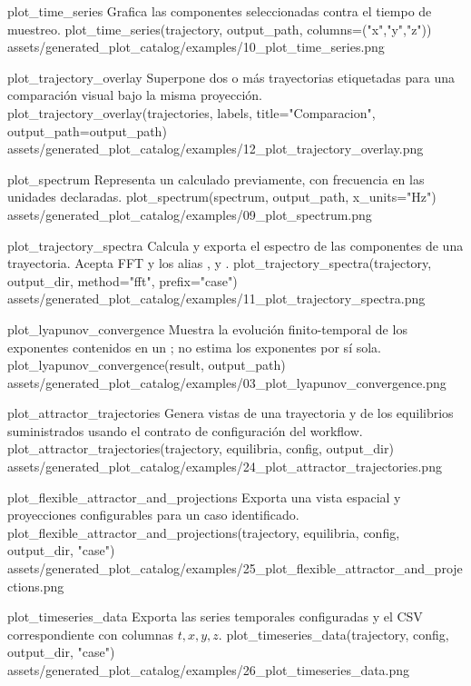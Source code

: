 \plotcatalogentry
  {plot_time_series}
  {Grafica las componentes seleccionadas contra el tiempo de muestreo.}
  {plot_time_series(trajectory, output_path, columns=("x","y","z"))}
  {assets/generated_plot_catalog/examples/10_plot_time_series.png}

\plotcatalogentry
  {plot_trajectory_overlay}
  {Superpone dos o más trayectorias etiquetadas para una comparación visual
  bajo la misma proyección.}
  {plot_trajectory_overlay(trajectories, labels, title="Comparacion", output_path=output_path)}
  {assets/generated_plot_catalog/examples/12_plot_trajectory_overlay.png}

\plotcatalogentry
  {plot_spectrum}
  {Representa un  calculado previamente, con
  frecuencia en las unidades declaradas.}
  {plot_spectrum(spectrum, output_path, x_units="Hz")}
  {assets/generated_plot_catalog/examples/09_plot_spectrum.png}

\plotcatalogentry
  {plot_trajectory_spectra}
  {Calcula y exporta el espectro de las componentes de una trayectoria. Acepta
  FFT y los alias ,  y
  .}
  {plot_trajectory_spectra(trajectory, output_dir, method="fft", prefix="case")}
  {assets/generated_plot_catalog/examples/11_plot_trajectory_spectra.png}

\plotcatalogentry
  {plot_lyapunov_convergence}
  {Muestra la evolución finito-temporal de los exponentes contenidos en un
  ; no estima los exponentes por sí sola.}
  {plot_lyapunov_convergence(result, output_path)}
  {assets/generated_plot_catalog/examples/03_plot_lyapunov_convergence.png}

\plotcatalogentry
  {plot_attractor_trajectories}
  {Genera vistas de una trayectoria y de los equilibrios suministrados usando
  el contrato de configuración del workflow.}
  {plot_attractor_trajectories(trajectory, equilibria, config, output_dir)}
  {assets/generated_plot_catalog/examples/24_plot_attractor_trajectories.png}

\plotcatalogentry
  {plot_flexible_attractor_and_projections}
  {Exporta una vista espacial y proyecciones configurables para un caso
  identificado.}
  {plot_flexible_attractor_and_projections(trajectory, equilibria, config, output_dir, "case")}
  {assets/generated_plot_catalog/examples/25_plot_flexible_attractor_and_projections.png}

\plotcatalogentry
  {plot_timeseries_data}
  {Exporta las series temporales configuradas y el CSV correspondiente con
  columnas \(t,x,y,z\).}
  {plot_timeseries_data(trajectory, config, output_dir, "case")}
  {assets/generated_plot_catalog/examples/26_plot_timeseries_data.png}

